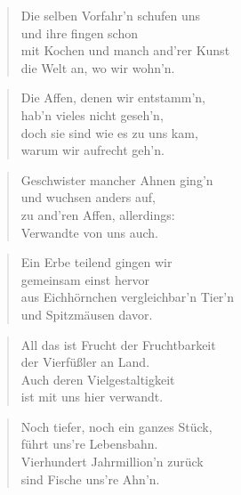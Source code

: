 \documentclass[10pt,a4paper]{article}
\begin{document}
\begin{paracol}{2}
\begin{verse}
Die selben Vorfahr’n schufen uns \\
und ihre fingen schon \\
mit Kochen und manch and’rer Kunst \\
die Welt an, wo wir wohn’n. \\
\end{verse}

\begin{verse}
Die Affen, denen wir entstamm’n, \\
hab’n vieles nicht geseh’n, \\
doch sie sind wie es zu uns kam, \\
warum wir aufrecht geh’n. \\
\end{verse}

\begin{verse}
Geschwister mancher Ahnen ging’n \\
und wuchsen anders auf, \\
zu and’ren Affen, allerdings: \\
Verwandte von uns auch. \\
\end{verse}

\begin{verse}
Ein Erbe teilend gingen wir \\
gemeinsam einst hervor \\
aus Eichhörnchen vergleichbar’n Tier’n \\
und Spitzmäusen davor. \\
\end{verse}

\begin{verse}
All das ist Frucht der Fruchtbarkeit \\
der Vierfüßler an Land. \\
Auch deren Vielgestaltigkeit \\
ist mit uns hier verwandt. \\
\end{verse}

\begin{verse}
Noch tiefer, noch ein ganzes Stück, \\
führt uns’re Lebensbahn. \\
Vierhundert Jahrmillion’n zurück \\
sind Fische uns’re Ahn’n. \\
\end{verse}


\end{paracol}
\end{document}
